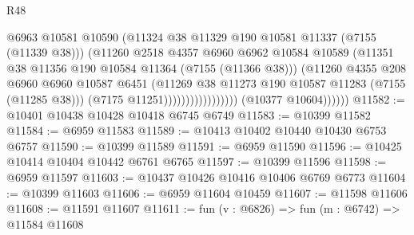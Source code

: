 \begin{lexlean}{R48}
\begin{coremodule}
                                          @6963
                                          @10581
                                          @10590
                                          (@11324
                                            @38
                                            @11329
                                            @190
                                            @10581
                                            @11337
                                            (@7155 (@11339 @38)))
                                          (@11260
                                            @2518
                                            @4357
                                            @6960
                                            @6962
                                            @10584
                                            @10589
                                            (@11351
                                              @38
                                              @11356
                                              @190
                                              @10584
                                              @11364
                                              (@7155 (@11366 @38)))
                                            (@11260
                                              @4355
                                              @208
                                              @6960
                                              @6960
                                              @10587
                                              @6451
                                              (@11269
                                                @38
                                                @11273
                                                @190
                                                @10587
                                                @11283
                                                (@7155 (@11285 @38)))
                                              (@7175 @11251)))))))))))))))))
              (@10377 @10604))))))
@11582 := @10401 @10438 @10428 @10418 @6745 @6749
@11583 := @10399 @11582
@11584 := @6959 @11583
@11589 := @10413 @10402 @10440 @10430 @6753 @6757
@11590 := @10399 @11589
@11591 := @6959 @11590
@11596 := @10425 @10414 @10404 @10442 @6761 @6765
@11597 := @10399 @11596
@11598 := @6959 @11597
@11603 := @10437 @10426 @10416 @10406 @6769 @6773
@11604 := @10399 @11603
@11606 := @6959 @11604 @10459
@11607 := @11598 @11606
@11608 := @11591 @11607
@11611 := fun (v : @6826) => fun (m : @6742) => @11584 @11608

\end{coremodule}
\end{lexlean}
